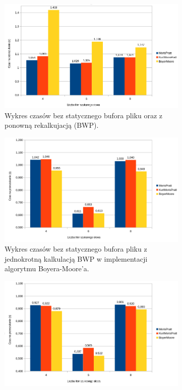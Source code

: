 \begin{figure}
\centering
\begin{subfigure}{0.7\textwidth}
    \includegraphics[width=\textwidth]{./images/GraphFirstAttempt.png}
    \caption{Wykres czasów bez statycznego bufora pliku oraz z ponowną 
    rekalkujacją (BWP).}
    \label{fig:GraphFirstAttempt}
\end{subfigure}
\begin{subfigure}{0.7\textwidth}
    \includegraphics[width=\textwidth]{./images/GraphPreAllocBM.png}
    \caption{Wykres czasów bez statycznego bufora pliku z jednokrotną kalkulacją
     BWP w implementacji algorytmu Boyera-Moore'a. }
    \label{fig:GraphPreAllocBM}
\end{subfigure}
\begin{subfigure}{0.7\textwidth}
    \includegraphics[width=\textwidth]{./images/GraphStaticPreallocAndFileBuffer.png}

\end{subfigure}
\end{figure}
